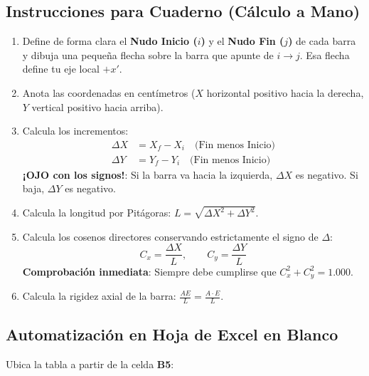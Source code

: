 \documentclass[10pt,a4paper]{article}
\begin{document}
\subsection{Instrucciones para Cuaderno (Cálculo a Mano)}
\begin{enumerate}
    \item Define de forma clara el \textbf{Nudo Inicio ($i$)} y el \textbf{Nudo Fin ($j$)} de cada barra y dibuja una pequeña flecha sobre la barra que apunte de $i \to j$. Esa flecha define tu eje local $+x'$.
    \item Anota las coordenadas en centímetros ($X$ horizontal positivo hacia la derecha, $Y$ vertical positivo hacia arriba).
    \item Calcula los incrementos:
    \begin{align*}
        \Delta X &= X_f - X_i \quad \text{(Fin menos Inicio)} \\
        \Delta Y &= Y_f - Y_i \quad \text{(Fin menos Inicio)}
    \end{align*}
    \textbf{¡OJO con los signos!}: Si la barra va hacia la izquierda, $\Delta X$ es negativo. Si baja, $\Delta Y$ es negativo.
    \item Calcula la longitud por Pitágoras: $L = \sqrt{\Delta X^2 + \Delta Y^2}$.
    \item Calcula los cosenos directores conservando estrictamente el signo de $\Delta$:
    \[
        C_x = \frac{\Delta X}{L}, \qquad C_y = \frac{\Delta Y}{L}
    \]
    \textbf{Comprobación inmediata}: Siempre debe cumplirse que $C_x^2 + C_y^2 = 1.000$.
    \item Calcula la rigidez axial de la barra: $\frac{AE}{L} = \frac{A \cdot E}{L}$.
\end{enumerate}

\subsection{Automatización en Hoja de Excel en Blanco}
Ubica la tabla a partir de la celda \textbf{B5}:
\end{document}
